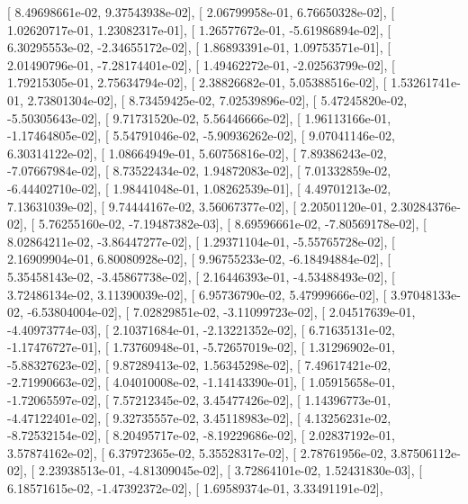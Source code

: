 \documentclass{article}
\begin{document}
       [  8.49698661e-02,   9.37543938e-02],
       [  2.06799958e-01,   6.76650328e-02],
       [  1.02620717e-01,   1.23082317e-01],
       [  1.26577672e-01,  -5.61986894e-02],
       [  6.30295553e-02,  -2.34655172e-02],
       [  1.86893391e-01,   1.09753571e-01],
       [  2.01490796e-01,  -7.28174401e-02],
       [  1.49462272e-01,  -2.02563799e-02],
       [  1.79215305e-01,   2.75634794e-02],
       [  2.38826682e-01,   5.05388516e-02],
       [  1.53261741e-01,   2.73801304e-02],
       [  8.73459425e-02,   7.02539896e-02],
       [  5.47245820e-02,  -5.50305643e-02],
       [  9.71731520e-02,   5.56446666e-02],
       [  1.96113166e-01,  -1.17464805e-02],
       [  5.54791046e-02,  -5.90936262e-02],
       [  9.07041146e-02,   6.30314122e-02],
       [  1.08664949e-01,   5.60756816e-02],
       [  7.89386243e-02,  -7.07667984e-02],
       [  8.73522434e-02,   1.94872083e-02],
       [  7.01332859e-02,  -6.44402710e-02],
       [  1.98441048e-01,   1.08262539e-01],
       [  4.49701213e-02,   7.13631039e-02],
       [  9.74444167e-02,   3.56067377e-02],
       [  2.20501120e-01,   2.30284376e-02],
       [  5.76255160e-02,  -7.19487382e-03],
       [  8.69596661e-02,  -7.80569178e-02],
       [  8.02864211e-02,  -3.86447277e-02],
       [  1.29371104e-01,  -5.55765728e-02],
       [  2.16909904e-01,   6.80080928e-02],
       [  9.96755233e-02,  -6.18494884e-02],
       [  5.35458143e-02,  -3.45867738e-02],
       [  2.16446393e-01,  -4.53488493e-02],
       [  3.72486134e-02,   3.11390039e-02],
       [  6.95736790e-02,   5.47999666e-02],
       [  3.97048133e-02,  -6.53804004e-02],
       [  7.02829851e-02,  -3.11099723e-02],
       [  2.04517639e-01,  -4.40973774e-03],
       [  2.10371684e-01,  -2.13221352e-02],
       [  6.71635131e-02,  -1.17476727e-01],
       [  1.73760948e-01,  -5.72657019e-02],
       [  1.31296902e-01,  -5.88327623e-02],
       [  9.87289413e-02,   1.56345298e-02],
       [  7.49617421e-02,  -2.71990663e-02],
       [  4.04010008e-02,  -1.14143390e-01],
       [  1.05915658e-01,  -1.72065597e-02],
       [  7.57212345e-02,   3.45477426e-02],
       [  1.14396773e-01,  -4.47122401e-02],
       [  9.32735557e-02,   3.45118983e-02],
       [  4.13256231e-02,  -8.72532154e-02],
       [  8.20495717e-02,  -8.19229686e-02],
       [  2.02837192e-01,   3.57874162e-02],
       [  6.37972365e-02,   5.35528317e-02],
       [  2.78761956e-02,   3.87506112e-02],
       [  2.23938513e-01,  -4.81309045e-02],
       [  3.72864101e-02,   1.52431830e-03],
       [  6.18571615e-02,  -1.47392372e-02],
       [  1.69589374e-01,   3.33491191e-02],
\end{document}
